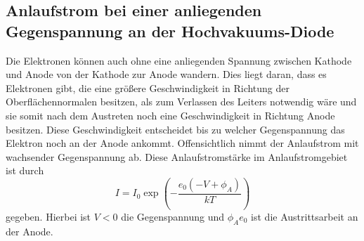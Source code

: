 \subsection{Anlaufstrom bei einer anliegenden Gegenspannung an der Hochvakuums-Diode}
Die Elektronen können auch ohne eine anliegenden Spannung zwischen Kathode und Anode von der Kathode zur Anode wandern. Dies liegt daran, dass es Elektronen gibt, die eine größere Geschwindigkeit in Richtung der Oberflächennormalen besitzen, als zum Verlassen des Leiters notwendig wäre und sie somit nach dem Austreten noch eine Geschwindigkeit in Richtung Anode besitzen. Diese Geschwindigkeit entscheidet bis zu welcher Gegenspannung das Elektron noch an der Anode ankommt. Offensichtlich nimmt der Anlaufstrom mit wachsender Gegenspannung ab. Diese Anlaufstromstärke im Anlaufstromgebiet ist durch 
\begin{equation} 
	I = I_0 \exp\left(-\frac{e_0 (-V +\phi_A)}{k T}\right) \label{eq:Anlaufstromstärke}
\end{equation}
gegeben. Hierbei ist $V<0$ die Gegenspannung und $\phi_A e_0$ ist die Austrittsarbeit an der Anode.



